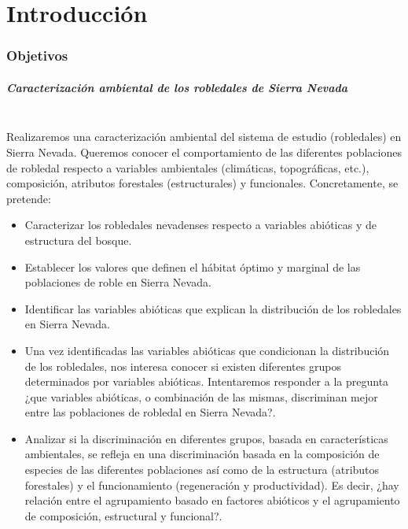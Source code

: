 %
\chapter{Introducción}
\label{sec:intro}

\subsection{Objetivos}

\paragraph{Caracterización ambiental de los robledales de Sierra Nevada} \mbox{} \\
Realizaremos una caracterización ambiental del sistema de estudio (robledales) en Sierra Nevada. Queremos conocer el comportamiento de las diferentes poblaciones de robledal respecto a variables ambientales (climáticas, topográficas, etc.), composición, atributos forestales (estructurales) y funcionales. Concretamente, se pretende:

\begin{itemize}
	\item Caracterizar los robledales nevadenses respecto a variables abióticas y de estructura del bosque.
	\item Establecer los valores que definen el hábitat óptimo y marginal de las poblaciones de roble en Sierra Nevada.
	\item Identificar las variables abióticas que explican la distribución de los robledales en Sierra Nevada.
	\item Una vez identificadas las variables abióticas que condicionan la distribución de los robledales, nos interesa conocer si existen diferentes grupos determinados por variables abióticas. Intentaremos responder a la pregunta ¿que variables abióticas, o combinación de las mismas, discriminan mejor entre las poblaciones de robledal en Sierra Nevada?.
	\item Analizar si la discriminación en diferentes grupos, basada en características ambientales, se refleja en una discriminación basada en la composición de especies de las diferentes poblaciones así como de la estructura (atributos forestales) y el funcionamiento (regeneración y productividad). Es decir, ¿hay relación entre el agrupamiento basado en factores abióticos y el agrupamiento de composición, estructural y funcional?. 
\end{itemize}


